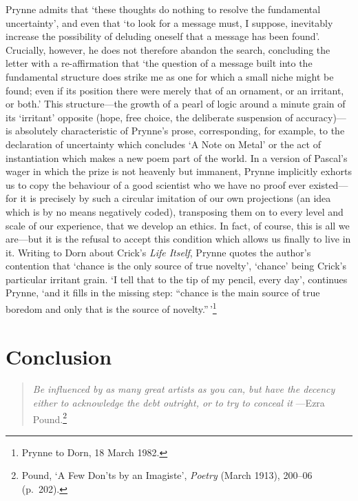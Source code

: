 \documentclass[]{article}
\begin{document}
Prynne admits that `these thoughts do nothing to resolve the fundamental
uncertainty', and even that `to look for a message must, I suppose,
inevitably increase the possibility of deluding oneself that a message
has been found'. Crucially, however, he does not therefore abandon the
search, concluding the letter with a re-affirmation that `the question
of a message built into the fundamental structure does strike me as one
for which a small niche might be found; even if its position there were
merely that of an ornament, or an irritant, or both.' This
structure---the growth of a pearl of logic around a minute grain of its
`irritant' opposite (hope, free choice, the deliberate suspension of
accuracy)---is absolutely characteristic of Prynne's prose,
corresponding, for example, to the declaration of uncertainty which
concludes `A Note on Metal' or the act of instantiation which makes a
new poem part of the world. In a version of Pascal's wager in which the
prize is not heavenly but immanent, Prynne implicitly exhorts us to copy
the behaviour of a good scientist who we have no proof ever
existed---for it is precisely by such a circular imitation of our own
projections (an idea which is by no means negatively coded), transposing
them on to every level and scale of our experience, that we develop an
ethics. In fact, of course, this is all we are---but it is the refusal
to accept this condition which allows us finally to live in it. Writing
to Dorn about Crick's \emph{Life Itself}, Prynne quotes the author's
contention that `chance is the only source of true novelty', `chance'
being Crick's particular irritant grain. `I tell that to the tip of my
pencil, every day', continues Prynne, `and it fills in the missing step:
``chance is the main source of true boredom and only that is the source
of novelty.''\,'\footnote{Prynne to Dorn, 18 March 1982.} \newpage

\section{Conclusion}\label{conclusion}

\begin{quote}
\emph{Be influenced by as many great artists as you can, but have the
decency either to acknowledge the debt outright, or to try to conceal
it} ---Ezra Pound.\footnote{Pound, `A Few Don'ts by an Imagiste',
  \emph{Poetry} (March 1913), 200--06 (p.~202).}
\end{quote}
\end{document}
